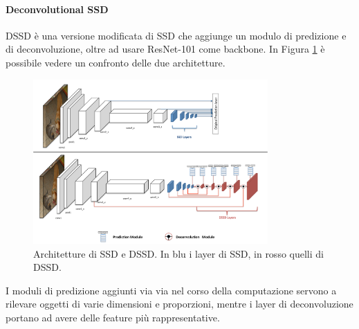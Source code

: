 \paragraph{Deconvolutional SSD} 
\ac{DSSD} \cite{fu2017dssd} è una versione modificata di \ac{SSD} che aggiunge un modulo di predizione e di deconvoluzione, oltre ad usare ResNet-101 come backbone. In Figura \ref{fig:ssd_architectures} è possibile vedere un confronto delle due architetture.
\begin{figure}
    \centering
    \includegraphics[width=0.8\textwidth]{images/architecture_ssd.pdf}
    \caption{Architetture di SSD e DSSD. In blu i layer di SSD, in rosso quelli di DSSD.}
    \label{fig:ssd_architectures}
\end{figure}

I moduli di predizione aggiunti via via nel corso della computazione servono a rilevare oggetti di varie dimensioni e proporzioni, mentre i layer di deconvoluzione portano ad avere delle feature più rappresentative.
